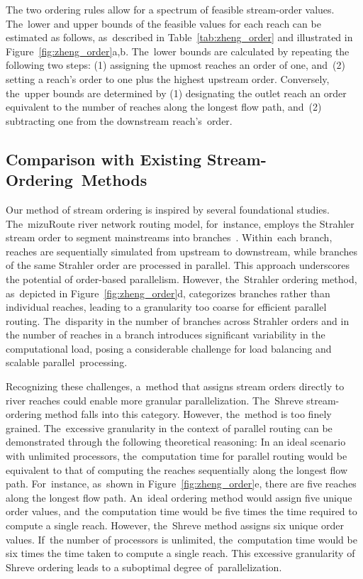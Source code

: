 \documentclass[water,article,accept,pdftex,moreauthors]{Definitions/mdpi}
\begin{document}
The two ordering rules allow for a spectrum of feasible stream-order values. The~lower and upper bounds of the feasible values for each reach can be estimated as follows, as~described in Table~\ref{tab:zheng_order} and illustrated in Figure~\ref{fig:zheng_order}a,b. The~lower bounds are calculated by repeating the following two steps: (1) assigning the upmost reaches an order of one, and~(2) setting a reach's order to one plus the highest upstream order. Conversely, the~upper bounds are determined by (1) designating the outlet reach an order equivalent to the number of reaches along the longest flow path, and~(2) subtracting one from the downstream reach's~order.


\subsection{Comparison with Existing Stream-Ordering~Methods}
\label{sec:comparison}

Our method of stream ordering is inspired by several foundational studies. The~mizuRoute river network routing model, for~instance, employs the Strahler stream order to segment mainstreams into branches~\cite{mizukami2021JAMES}. Within~each branch, reaches are sequentially simulated from upstream to downstream, while branches of the same Strahler order are processed in parallel. This approach underscores the potential of order-based parallelism. However, the~Strahler ordering method, as~depicted in Figure~\ref{fig:zheng_order}d, categorizes branches rather than individual reaches, leading to a granularity too coarse for efficient parallel routing. The~disparity in the number of branches across Strahler orders and in the number of reaches in a branch introduces significant variability in the computational load, posing a considerable challenge for load balancing and scalable parallel~processing.

Recognizing these challenges, a~method that assigns stream orders directly to river reaches could enable more granular parallelization. The~Shreve stream-ordering method falls into this category. However, the~method is too finely grained. The~excessive granularity in the context of parallel routing can be demonstrated through the following theoretical reasoning: In an ideal scenario with unlimited processors, the~computation time for parallel routing would be equivalent to that of computing the reaches sequentially along the longest flow path. For~instance, as~shown in Figure~\ref{fig:zheng_order}e, there are five reaches along the longest flow path. An~ideal ordering method would assign five unique order values, and~the computation time would be five times the time required to compute a single reach. However, the~Shreve method assigns six unique order values. If~the number of processors is unlimited, the~computation time would be six times the time taken to compute a single reach. This excessive granularity of Shreve ordering leads to a suboptimal degree of~parallelization.
\end{document}
